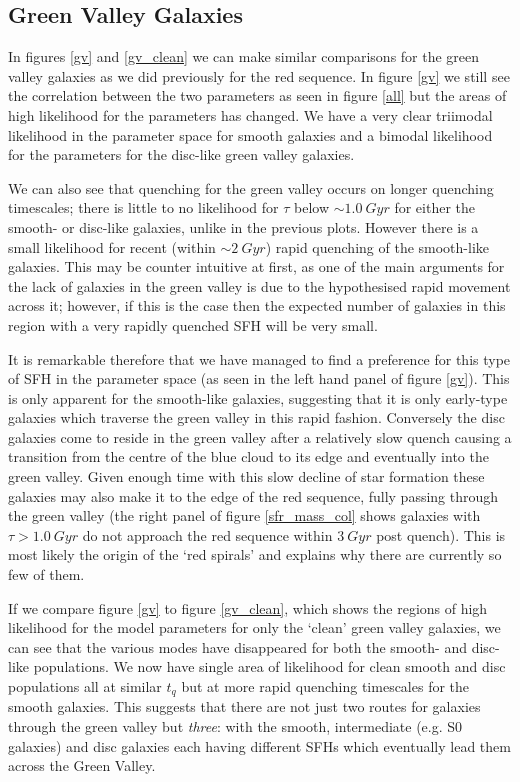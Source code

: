 \documentclass{mn2e}
\begin{document}
\subsection{Green Valley Galaxies}


In figures \ref{gv} and \ref{gv_clean} we can make similar comparisons for the green valley galaxies as we did previously for the red sequence. In figure \ref{gv} we still see the correlation between the two parameters as seen in figure \ref{all} but the areas of high likelihood for the parameters has changed. We have a very clear triimodal likelihood in the parameter space for smooth galaxies and a bimodal likelihood for the parameters for the disc-like green valley galaxies. 

We can also see that quenching for the green valley occurs on longer quenching timescales; there is little to no likelihood for $\tau$ below $\sim 1.0 ~Gyr$ for either the smooth- or disc-like galaxies, unlike in the previous plots. However there is a small likelihood for recent (within $\sim 2~Gyr$) rapid quenching of the smooth-like galaxies. This may be counter intuitive at first, as one of the main arguments for the lack of galaxies in the green valley is due to the hypothesised rapid movement across it; however, if this is the case then the expected number of galaxies in this region with a very rapidly quenched SFH will be very small. 

It is remarkable therefore that we have managed to find a preference for this type of SFH in the parameter space (as seen in the left hand panel of figure \ref{gv}). This is only apparent for the smooth-like galaxies, suggesting that it is only early-type galaxies which traverse the green valley in this rapid fashion. Conversely the disc galaxies come to reside in the green valley after a relatively slow quench causing a transition from the centre of the blue cloud to its edge and eventually into the green valley. Given enough time with this slow decline of star formation these galaxies may also make it to the edge of the red sequence, fully passing through the green valley (the right panel of figure \ref{sfr_mass_col} shows galaxies with $\tau > 1.0~Gyr$ do not approach the red sequence within $3~Gyr$ post quench). This is most likely the origin of the `red spirals' and explains why there are currently so few of them.

If we compare figure \ref{gv} to figure \ref{gv_clean}, which shows the regions of high likelihood for the model parameters for only the `clean' green valley galaxies, we can see that the various modes have disappeared for both the smooth- and disc- like populations. We now have single area of likelihood for clean smooth and disc populations all at similar $t_q$ but at more rapid quenching timescales for the smooth galaxies. This suggests that there are not just two routes for galaxies through the green valley but \emph{three}: with the smooth, intermediate (e.g. S0 galaxies) and disc galaxies each having different SFHs which eventually lead them across the Green Valley.
\end{document}

